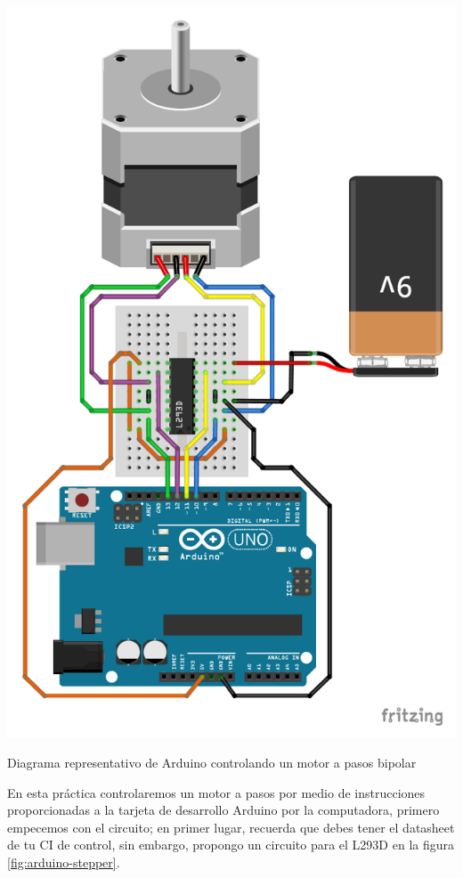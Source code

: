 		\begin{marginfigure}
			\begin{center}
				\includegraphics[width=\textwidth]{images/arduino-l293d-stepper.pdf}
				\caption{Diagrama representativo de Arduino controlando un motor a pasos bipolar}
				\label{fig:arduino-stepper}
			\end{center}
		\end{marginfigure}

		En esta práctica controlaremos un motor a pasos por medio de instrucciones proporcionadas a la tarjeta de desarrollo Arduino por la computadora, primero empecemos con el circuito; en primer lugar, recuerda que debes tener el datasheet de tu CI de control, sin embargo, propongo un circuito para el L293D en la figura \ref{fig:arduino-stepper}.

